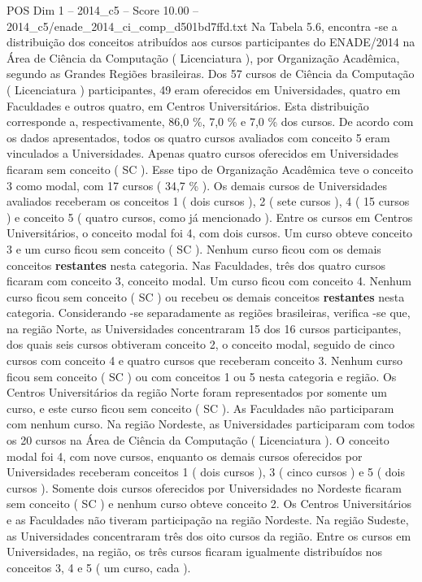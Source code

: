 \begin{textsample}{POS Dim 1 – 2014\_c5 – Score 10.00 – 2014\_c5/enade\_2014\_ci\_comp\_d501bd7ffd.txt}
Na Tabela 5.6, encontra -se a distribuição dos conceitos atribuídos aos cursos participantes do ENADE/2014 na Área de Ciência da Computação ( Licenciatura ), por Organização Acadêmica, segundo as Grandes Regiões brasileiras.
Dos 57 cursos de Ciência da Computação ( Licenciatura ) participantes, 49 eram oferecidos em Universidades, quatro em Faculdades e outros quatro, em Centros Universitários.
Esta distribuição corresponde a, respectivamente, 86,0 \%, 7,0 \% e 7,0 \% dos cursos.
De acordo com os dados apresentados, todos os quatro cursos avaliados com conceito 5 eram vinculados a Universidades.
Apenas quatro cursos oferecidos em Universidades ficaram sem conceito ( SC ).
Esse tipo de Organização Acadêmica teve o conceito 3 como modal, com 17 cursos ( 34,7 \% ).
Os demais cursos de Universidades avaliados receberam os conceitos 1 ( dois cursos ), 2 ( sete cursos ), 4 ( 15 cursos ) e conceito 5 ( quatro cursos, como já mencionado ).
Entre os cursos em Centros Universitários, o conceito modal foi 4, com dois cursos.
Um curso obteve conceito 3 e um curso ficou sem conceito ( SC ).
Nenhum curso ficou com os demais conceitos \textbf{restantes} nesta categoria.
Nas Faculdades, três dos quatro cursos ficaram com conceito 3, conceito modal.
Um curso ficou com conceito 4.
Nenhum curso ficou sem conceito ( SC ) ou recebeu os demais conceitos \textbf{restantes} nesta categoria.
Considerando -se separadamente as regiões brasileiras, verifica -se que, na região Norte, as Universidades concentraram 15 dos 16 cursos participantes, dos quais seis cursos obtiveram conceito 2, o conceito modal, seguido de cinco cursos com conceito 4 e quatro cursos que receberam conceito 3.
Nenhum curso ficou sem conceito ( SC ) ou com conceitos 1 ou 5 nesta categoria e região.
Os Centros Universitários da região Norte foram representados por somente um curso, e este curso ficou sem conceito ( SC ).
As Faculdades não participaram com nenhum curso.
Na região Nordeste, as Universidades participaram com todos os 20 cursos na Área de Ciência da Computação ( Licenciatura ).
O conceito modal foi 4, com nove cursos, enquanto os demais cursos oferecidos por Universidades receberam conceitos 1 ( dois cursos ), 3 ( cinco cursos ) e 5 ( dois cursos ).
Somente dois cursos oferecidos por Universidades no Nordeste ficaram sem conceito ( SC ) e nenhum curso obteve conceito 2.
Os Centros Universitários e as Faculdades não tiveram participação na região Nordeste.
Na região Sudeste, as Universidades concentraram três dos oito cursos da região.
Entre os cursos em Universidades, na região, os três cursos ficaram igualmente distribuídos nos conceitos 3, 4 e 5 ( um curso, cada ).

\end{textsample}
